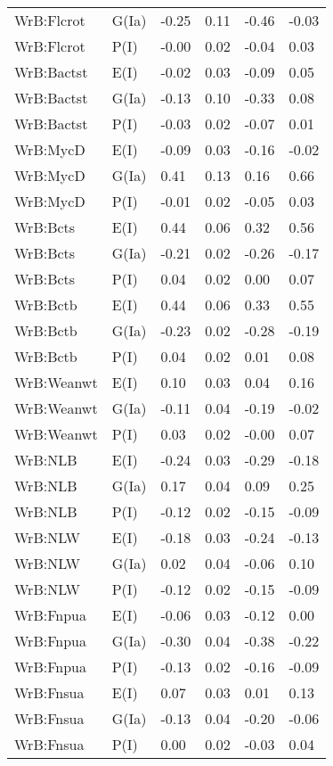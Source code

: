 \begin{center}
\begin{longtable}{|p{1.1in}|p{0.7in}|p{0.7in}|p{0.6in}|p{0.6in}|p{0.6in}|}
  WrB:Flcrot & G(Ia) & -0.25 & 0.11 & -0.46 & -0.03 \\ 
  WrB:Flcrot & P(I) & -0.00 & 0.02 & -0.04 & 0.03 \\ 
  WrB:Bactst & E(I) & -0.02 & 0.03 & -0.09 & 0.05 \\ 
  WrB:Bactst & G(Ia) & -0.13 & 0.10 & -0.33 & 0.08 \\ 
  WrB:Bactst & P(I) & -0.03 & 0.02 & -0.07 & 0.01 \\ 
  WrB:MycD & E(I) & -0.09 & 0.03 & -0.16 & -0.02 \\ 
  WrB:MycD & G(Ia) & 0.41 & 0.13 & 0.16 & 0.66 \\ 
  WrB:MycD & P(I) & -0.01 & 0.02 & -0.05 & 0.03 \\ 
  WrB:Bcts & E(I) & 0.44 & 0.06 & 0.32 & 0.56 \\ 
  WrB:Bcts & G(Ia) & -0.21 & 0.02 & -0.26 & -0.17 \\ 
  WrB:Bcts & P(I) & 0.04 & 0.02 & 0.00 & 0.07 \\ 
  WrB:Bctb & E(I) & 0.44 & 0.06 & 0.33 & 0.55 \\ 
  WrB:Bctb & G(Ia) & -0.23 & 0.02 & -0.28 & -0.19 \\ 
  WrB:Bctb & P(I) & 0.04 & 0.02 & 0.01 & 0.08 \\ 
  WrB:Weanwt & E(I) & 0.10 & 0.03 & 0.04 & 0.16 \\ 
  WrB:Weanwt & G(Ia) & -0.11 & 0.04 & -0.19 & -0.02 \\ 
  WrB:Weanwt & P(I) & 0.03 & 0.02 & -0.00 & 0.07 \\ 
  WrB:NLB & E(I) & -0.24 & 0.03 & -0.29 & -0.18 \\ 
  WrB:NLB & G(Ia) & 0.17 & 0.04 & 0.09 & 0.25 \\ 
  WrB:NLB & P(I) & -0.12 & 0.02 & -0.15 & -0.09 \\ 
  WrB:NLW & E(I) & -0.18 & 0.03 & -0.24 & -0.13 \\ 
  WrB:NLW & G(Ia) & 0.02 & 0.04 & -0.06 & 0.10 \\ 
  WrB:NLW & P(I) & -0.12 & 0.02 & -0.15 & -0.09 \\ 
  WrB:Fnpua & E(I) & -0.06 & 0.03 & -0.12 & 0.00 \\ 
  WrB:Fnpua & G(Ia) & -0.30 & 0.04 & -0.38 & -0.22 \\ 
  WrB:Fnpua & P(I) & -0.13 & 0.02 & -0.16 & -0.09 \\ 
  WrB:Fnsua & E(I) & 0.07 & 0.03 & 0.01 & 0.13 \\ 
  WrB:Fnsua & G(Ia) & -0.13 & 0.04 & -0.20 & -0.06 \\ 
  WrB:Fnsua & P(I) & 0.00 & 0.02 & -0.03 & 0.04 \\ 

\end{longtable}
\end{center}
